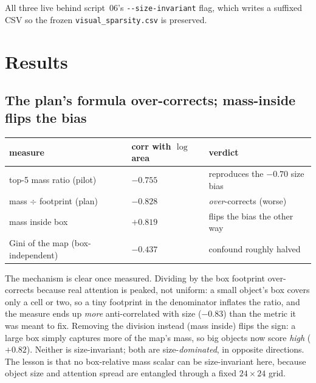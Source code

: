 All three live behind script~06's \texttt{-{}-size-invariant} flag, which writes a suffixed CSV so the
frozen \texttt{visual\_sparsity.csv} is preserved.

\section{Results}

\subsection{The plan's formula over-corrects; mass-inside flips the bias}

\begin{center}
\begin{tabular}{p{5.6cm}p{3.2cm}p{3.4cm}}
\toprule
\textbf{measure} & \textbf{corr with $\log$ area} & \textbf{verdict} \\
\midrule
top-5 mass ratio (pilot)          & $-0.755$ & reproduces the $-0.70$ size bias \\
mass $\div$ footprint (plan)      & $-0.828$ & \emph{over}-corrects (worse) \\
mass inside box                   & $+0.819$ & flips the bias the other way \\
Gini of the map (box-independent) & $\mathbf{-0.437}$ & confound roughly halved \\
\bottomrule
\end{tabular}
\label{tab:p22-confound}
\end{center}

The mechanism is clear once measured. Dividing by the box footprint over-corrects because real
attention is peaked, not uniform: a small object's box covers only a cell or two, so a tiny footprint
in the denominator inflates the ratio, and the measure ends up \emph{more} anti-correlated with size
($-0.83$) than the metric it was meant to fix. Removing the division instead (mass inside) flips the
sign: a large box simply captures more of the map's mass, so big objects now score \emph{high}
($+0.82$). Neither is size-invariant; both are size-\emph{dominated}, in opposite directions. The
lesson is that no box-relative mass scalar can be size-invariant here, because object size and
attention spread are entangled through a fixed $24\times24$ grid.

